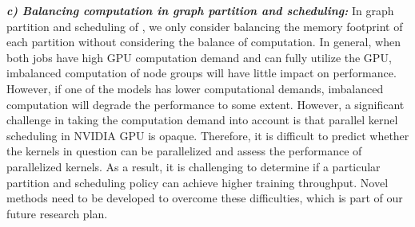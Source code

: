 \textbf{\textit{c) Balancing computation in graph partition and scheduling:}}
In graph partition and scheduling of \oursys{},
we only consider balancing the memory footprint of each partition without considering the balance of computation.
In general, when both jobs have high GPU computation demand and can fully utilize the GPU,
imbalanced computation of node groups will have little impact on performance.
However, if one of the models has lower computational demands,
imbalanced computation will degrade the performance to some extent.
However, a significant challenge in taking the computation demand into account is that
parallel kernel scheduling in NVIDIA GPU is opaque.
Therefore, it is difficult to predict whether the kernels in question can be parallelized and assess the performance of parallelized kernels.
As a result, it is challenging to determine if a particular partition and scheduling policy can achieve higher training throughput.
Novel methods need to be developed to overcome these difficulties, which is part of our future research plan.

